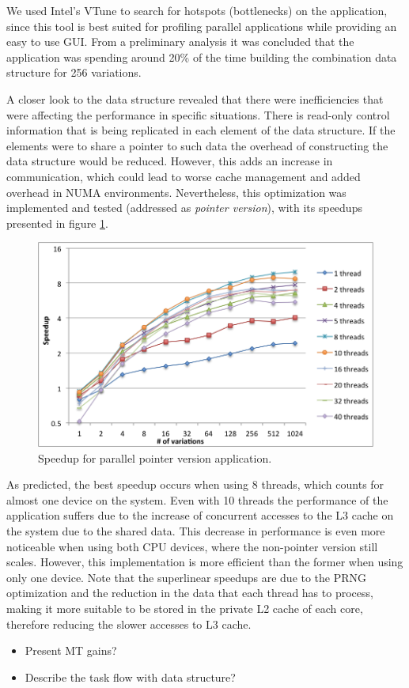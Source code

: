 We used Intel's VTune to search for hotspots (bottlenecks) on the application, since this tool is best suited for profiling parallel applications while providing an easy to use GUI. From a preliminary analysis it was concluded that the application was spending around 20\% of the time building the combination data structure for 256 variations.

A closer look to the data structure revealed that there were inefficiencies that were affecting the performance in specific situations. There is read-only control information that is being replicated in each element of the data structure. If the elements were to share a pointer to such data the overhead of constructing the data structure would be reduced. However, this adds an increase in communication, which could lead to worse cache management and added overhead in NUMA environments. Nevertheless, this optimization was implemented and tested (addressed as \textit{pointer version}), with its speedups presented in figure \ref{fig:pointer_speedup}.

\begin{figure}[!htp]
	\begin{center}
		\includegraphics[scale=0.4]{charts/speedup_pointer_omp.png}
		\caption{Speedup for \tth parallel pointer version application.}
		\label{fig:pointer_speedup}
	\end{center}
\end{figure}

As predicted, the best speedup occurs when using 8 threads, which counts for almost one device on the system. Even with 10 threads the performance of the application suffers due to the increase of concurrent accesses to the L3 cache on the system due to the shared data. This decrease in performance is even more noticeable when using both CPU devices, where the non-pointer version still scales. However, this implementation is more efficient than the former when using only one device. Note that the superlinear speedups are due to the PRNG optimization and the reduction in the data that each thread has to process, making it more suitable to be stored in the private L2 cache of each core, therefore reducing the slower accesses to L3 cache.

\begin{itemize}
	\item Present MT gains?
	\item Describe the task flow with data structure?
\end{itemize}
